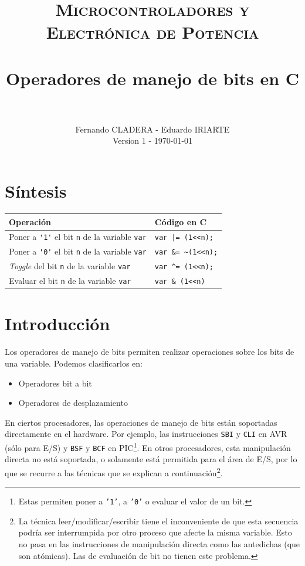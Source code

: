 \documentclass[paper=a4, fontsize=11pt]{scrartcl}	%
\title{%
		\usefont{OT1}{bch}{b}{n}
		\normalfont \normalsize \textsc{Microcontroladores y Electrónica de
    Potencia} \\ [25pt]
		\horrule{0.5pt} \\[0.4cm]
		\huge Operadores de manejo de bits en C\\
		\horrule{2pt} \\[0.5cm]
}
\author{%
  \normalfont \normalsize
        Fernando CLADERA - Eduardo IRIARTE \\[-3pt]
        \normalsize
        Version 1 - \today
}
\date{}
\numberwithin{equation}{section} %
\numberwithin{figure}{section} %
\numberwithin{table}{section} %
\begin{document}
\maketitle

\section{Síntesis}

\begin{table}[h]
  \centering
  \begin{tabular} {l | l}
    \hline
    \textbf{Operación} & \textbf{Código en C} \\ \hline
    Poner a \verb|'1'| el bit \verb|n| de la variable \verb|var| & \verb!var |= (1<<n);! \\
    Poner a \verb|'0'| el bit \verb|n| de la variable \verb|var| & \verb!var &= ~(1<<n);! \\
    \emph{Toggle} del bit \verb|n| de la variable   \verb|var| & \verb!var ^= (1<<n);! \\
    Evaluar el bit \verb|n| de la variable   \verb|var| & \verb!var & (1<<n)! \\
    \hline
  \end{tabular}
\end{table}

\section{Introducción}

Los operadores de manejo de bits permiten realizar operaciones sobre los
bits de una variable.
Podemos clasificarlos en:
\begin{itemize}
  \item Operadores {bit a bit}
  \item Operadores de desplazamiento
\end{itemize}
En ciertos procesadores, las operaciones de manejo de bits están
soportadas directamente en el hardware. Por ejemplo, las instrucciones
\verb|SBI| y \verb|CLI| en AVR  (sólo para E/S) y \verb|BSF| y
\verb|BCF| en PIC\footnote{Estas permiten poner a \texttt{'1'}, a
\texttt{'0'} o evaluar el valor de un bit.}. En otros procesadores, esta
manipulación directa no está soportada, o solamente está permitida para
el área de E/S, por lo que se recurre a las técnicas que se explican a
continuación\footnote{La técnica leer/modificar/escribir tiene el
inconveniente de que esta secuencia podría ser interrumpida por otro
proceso que afecte la misma variable.  Esto no pasa en las instrucciones
de manipulación directa como las antedichas (que son atómicas). Las de
evaluación de bit no tienen este problema.}.
\end{document}
